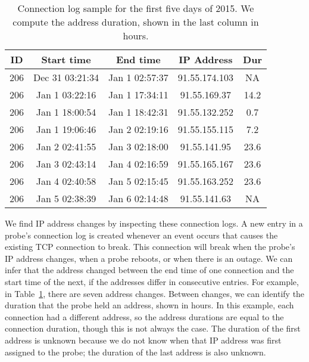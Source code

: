 \begin{table}[th]
  \scriptsize
  \centering
  \hspace{-0.04in}\begin{tabular}{c|c|c|c|c}
    \textbf{ID} & \textbf{Start time} & \textbf{End time} & \textbf{IP Address} & \textbf{Dur}\\
    \hline
    206 & Dec 31 03:21:34&Jan 1 02:57:37 & 91.55.174.103 & NA\\
    206 &  Jan 1 03:22:16 & Jan 1 17:34:11 & 91.55.169.37 & 14.2\\
    206 &  Jan 1 18:00:54 & Jan 1 18:42:31 & 91.55.132.252 & 0.7\\
    206 &  Jan 1 19:06:46 & Jan 2 02:19:16 & 91.55.155.115 & 7.2\\
    206 &  Jan 2 02:41:55 & Jan 3 02:18:00 & 91.55.141.95 & 23.6\\
    206 & Jan 3 02:43:14 & Jan 4 02:16:59 & 91.55.165.167 & 23.6\\
    206 & Jan 4 02:40:58 & Jan 5 02:15:45 & 91.55.163.252 & 23.6\\
    206 & Jan 5 02:38:39 & Jan 6 02:14:48 & 91.55.141.63 & NA\\
    \end{tabular}
  \caption{\label{tbl:sample}Connection log sample for the first five
    days of 2015. We compute the address duration, shown in the last column in hours.}
    
\end{table}


We find IP address changes by inspecting these connection
logs. A new entry in a probe's connection log is created
whenever an event occurs that causes the existing TCP
connection to break.  This connection will break when the
probe's IP address changes, when a probe reboots, or when
there is an outage.  We can infer that the address changed
between the end time of one connection and the start time of
the next, if the addresses differ in consecutive entries.  For example, in
Table~\ref{tbl:sample}, there are seven address changes.
Between changes, we can identify the duration that the probe
held an address, shown in hours.  In this example, each connection
had a different address, so the address durations are equal to the
connection duration, though this is not always the case.
The duration of the first
address is unknown because we do not know when that IP
address was first assigned to the probe; the duration of the
last address is also unknown. 

